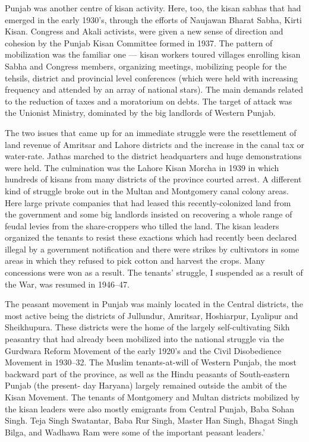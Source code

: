 \begin{multicols}{2}
Punjab was another centre of kisan activity. Here, too, the kisan sabhas that had emerged in the early 1930's, through the efforts of Naujawan Bharat Sabha, Kirti Kisan. Congress and Akali activists, were given a new sense of direction and cohesion by the Punjab Kisan Committee formed in 1937. The pattern of mobilization was the familiar one --- kisan workers toured villages enrolling kisan Sabha and Congress members, organizing meetings, mobilizing people for the tehsils, district and provincial level conferences (which were held with increasing frequency and attended by an array of national stars). The main demands related to the reduction of taxes and a moratorium on debts. The target of attack was the Unionist Ministry, dominated by the big landlords of Western Punjab.

The two issues that came up for an immediate struggle were the resettlement of land revenue of Amritsar and Lahore districts and the increase in the canal tax or water-rate. Jathas marched to the district headquarters and huge demonstrations were held. The culmination was the Lahore Kisan Morcha in 1939 in which hundreds of kisans from many districts of the province courted arrest. A different kind of struggle broke out in the Multan and Montgomery canal colony areas. Here large private companies that had leased this recently-colonized land from the government and some big landlords insisted on recovering a whole range of feudal levies from the share-croppers who tilled the land. The kisan leaders organized the tenants to resist these exactions which had recently been declared illegal by a government notification and there were strikes by cultivators in some areas in which they refused to pick cotton and harvest the crops. Many concessions were won as a result. The tenants' struggle, I suspended as a result of the War, was resumed in 1946--47.

The peasant movement in Punjab was mainly located in the Central districts, the most active being the districts of Jullundur, Amritsar, Hoshiarpur, Lyalipur and Sheikhupura. These districts were the home of the largely self-cultivating Sikh peasantry that had already been mobilized into the national struggle via the Gurdwara Reform Movement of the early 1920's and the Civil Disobedience Movement in 1930--32. The Muslim tenants-at-will of Western Punjab, the most backward part of the province, as well as the Hindu peasants of South-eastern Punjab (the present- day Haryana) largely remained outside the ambit of the Kisan Movement. The tenants of Montgomery and Multan districts mobilized by the kisan leaders were also mostly emigrants from Central Punjab, Baba Sohan Singh. Teja Singh Swatantar, Baba Rur Singh, Master Han Singh, Bhagat Singh Bilga, and Wadhawa Ram were some of the important peasant leaders.'


\end{multicols}
